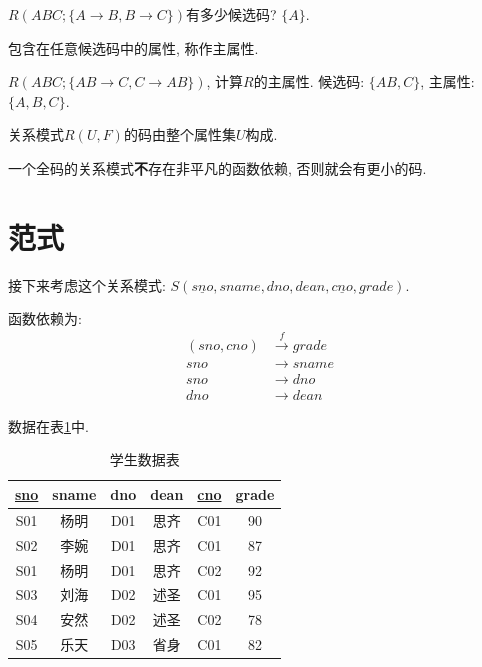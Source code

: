 \begin{example}
  $R(ABC;\{A\to B,B\to C\})$有多少候选码? $\{A\}$.
\end{example}

\begin{definition}[主属性]
  包含在任意候选码中的属性, 称作主属性.
\end{definition}

\begin{example}
  $R(ABC;\{AB\to C,C\to AB\})$, 计算$R$的主属性. 候选码: $\{AB,C\}$, 主属性: $\{A,B,C\}$.
\end{example}

\begin{definition}[全码]
  关系模式$R(U,F)$的码由整个属性集$U$构成.
\end{definition}

\begin{remark}
  一个全码的关系模式\textbf{不}存在非平凡的函数依赖, 否则就会有更小的码.
\end{remark}

\section{范式}

接下来考虑这个关系模式: $S(\underline{sno},sname,dno,dean,\underline{cno},grade)$.

函数依赖为:
\begin{align*}
  (sno,cno)&\overset{f}{\rightarrow} grade \\
  sno &\to sname \\
  sno &\to dno \\
  dno &\to dean
\end{align*}

数据在表\ref{tab:xuesheng1}中.

\begin{table}[H]
  \centering
  \begin{tabular}{|c|c|c|c|c|c|}
    \hline
    \underline{sno} & sname & dno & dean & \underline{cno} & grade \\
    \hline
    S01 & 杨明 & D01 & 思齐 & C01 & 90 \\ \hline
    S02 & 李婉 & D01 & 思齐 & C01 & 87 \\ \hline
    S01 & 杨明 & D01 & 思齐 & C02 & 92 \\ \hline
    S03 & 刘海 & D02 & 述圣 & C01 & 95 \\ \hline
    S04 & 安然 & D02 & 述圣 & C02 & 78 \\ \hline
    S05 & 乐天 & D03 & 省身 & C01 & 82 \\ \hline
  \end{tabular}
  \caption{学生数据表}
  \label{tab:xuesheng1}
\end{table}

